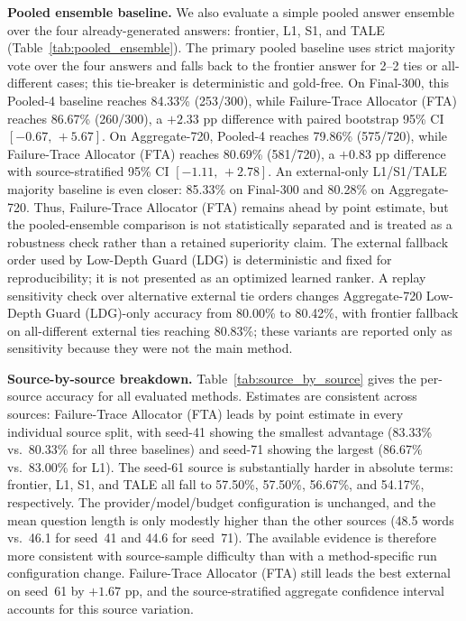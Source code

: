 \medskip\noindent\textbf{Pooled ensemble baseline.}
We also evaluate a simple pooled answer ensemble over the four already-generated
answers: frontier, L1, S1, and TALE (Table~\ref{tab:pooled_ensemble}).
The primary pooled baseline uses strict majority vote over the four answers and
falls back to the frontier answer for 2--2 ties or all-different cases; this
tie-breaker is deterministic and gold-free.
On Final-300, this Pooled-4 baseline reaches 84.33\% (253/300), while Failure-Trace Allocator (FTA)
reaches 86.67\% (260/300), a $+2.33$ pp difference with paired bootstrap 95\% CI
$[-0.67,\,+5.67]$.
On Aggregate-720, Pooled-4 reaches 79.86\% (575/720), while Failure-Trace Allocator (FTA) reaches
80.69\% (581/720), a $+0.83$ pp difference with source-stratified 95\% CI
$[-1.11,\,+2.78]$.
An external-only L1/S1/TALE majority baseline is even closer: 85.33\% on Final-300
and 80.28\% on Aggregate-720.
Thus, Failure-Trace Allocator (FTA) remains ahead by point estimate, but the pooled-ensemble
comparison is not statistically separated and is treated as a robustness check
rather than a retained superiority claim.
The external fallback order used by Low-Depth Guard (LDG) is deterministic and fixed for
reproducibility; it is not presented as an optimized learned ranker.  A replay
sensitivity check over alternative external tie orders changes Aggregate-720
Low-Depth Guard (LDG)-only accuracy from 80.00\% to 80.42\%, with frontier fallback on
all-different external ties reaching 80.83\%; these variants are reported only as
sensitivity because they were not the main method.

\medskip\noindent\textbf{Source-by-source breakdown.}
Table~\ref{tab:source_by_source} gives the per-source accuracy for all evaluated methods.
Estimates are consistent across sources: Failure-Trace Allocator (FTA) leads by point estimate in every
individual source split, with seed-41 showing the smallest advantage
(83.33\% vs.\ 80.33\% for all three baselines) and seed-71 showing the largest
(86.67\% vs.\ 83.00\% for L1).
The seed-61 source is substantially harder in absolute terms: frontier, L1, S1,
and TALE all fall to 57.50\%, 57.50\%, 56.67\%, and 54.17\%, respectively.
The provider/model/budget configuration is unchanged, and the mean question length
is only modestly higher than the other sources (48.5 words vs.\ 46.1 for seed~41
and 44.6 for seed~71).
The available evidence is therefore more consistent with source-sample difficulty than with a
method-specific run configuration change.
Failure-Trace Allocator (FTA) still leads the best external on seed~61 by $+1.67$ pp, and the
source-stratified aggregate confidence interval accounts for this source variation.

